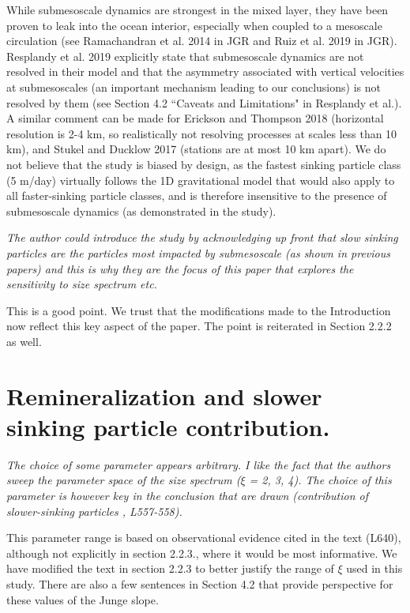 \documentclass[12pt,letter]{article}
\begin{document}
{\color{blue} While submesoscale dynamics are strongest in the mixed layer, they have been proven to leak into the ocean interior, especially when coupled to a mesoscale circulation (see Ramachandran et al. 2014 in JGR and Ruiz et al. 2019 in JGR). Resplandy et al. 2019 explicitly state that submesoscale dynamics are not resolved in their model and that the asymmetry associated with vertical velocities at submesoscales  (an important mechanism leading to our conclusions) is not resolved by them (see Section 4.2 ``Caveats and Limitations" in Resplandy et al.). A similar comment can be made for Erickson and Thompson 2018 (horizontal resolution is 2-4 km, so realistically not resolving processes at scales less than 10 km), and Stukel and Ducklow 2017 (stations are at most 10 km apart).
We do not believe that the study is biased by design, as the fastest sinking particle class (5 m/day) virtually follows the 1D gravitational model that would also apply to all faster-sinking particle classes, and is therefore insensitive to the presence of submesoscale dynamics (as demonstrated in the study).\\}

\textit{The author could introduce the study by acknowledging up front that slow sinking particles are the particles most impacted by submesoscale (as shown in previous papers) and this is why they are the focus of this paper that explores the sensitivity to size spectrum etc.}

{\color{blue}
	This is a good point. We trust that the modifications made to the Introduction now reflect this key aspect of the paper. The point is reiterated in Section 2.2.2 as well.}


\section*{Remineralization and slower sinking particle contribution.}
\textit{The choice of some parameter appears arbitrary. I like the fact that the authors sweep the parameter space of the size spectrum ($\xi$ = 2, 3, 4). The choice of this parameter is however key in the conclusion that are drawn (contribution of slower-sinking particles , L557-558).}

{\color{blue}
	This parameter range is based on observational evidence cited in the text (L640), although not explicitly in section 2.2.3., where it would be most informative. We have modified the text in section 2.2.3 to better justify the range of $\xi$ used in this study. There are also a few sentences in Section 4.2 that provide perspective for these values of the Junge slope. \\} %
\end{document}
